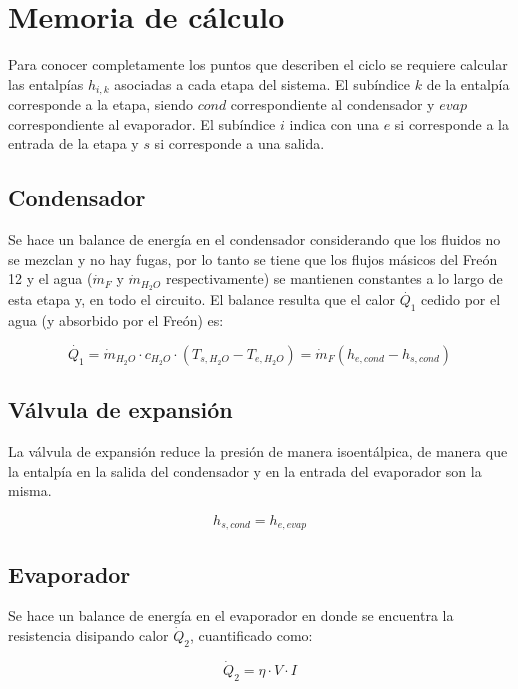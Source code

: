 \documentclass[11pt,letterpaper]{extarticle}        %
\numberwithin{equation}{section}                    %
\begin{document}
\section{Memoria de cálculo}
Para conocer completamente los puntos que describen el ciclo se requiere calcular las entalpías $h_{i,k}$ asociadas a cada etapa del sistema. El subíndice $k$ de la entalpía corresponde a la etapa, siendo $cond$ correspondiente al condensador y $evap$ correspondiente al evaporador. El subíndice $i$ indica con una $e$ si corresponde a la entrada de la etapa y $s$  si corresponde a una salida.

\subsection{Condensador}
Se hace un balance de energía en el condensador considerando que los fluidos no se mezclan y no hay fugas, por lo tanto se tiene que los flujos másicos del Freón 12 y el agua ($\dot{m}_F$ y $\dot{m}_{H_2O}$ respectivamente) se mantienen constantes a lo largo de esta etapa y, en todo el circuito. El balance resulta que el calor $\dot{Q_1}$ cedido por el agua (y absorbido por el Freón) es:

\begin{equation}
\label{e:Q1}
\dot{Q_1} = \dot{m}_{H_2O} \cdot c_{H_2O} \cdot (T_{s,H_2O}-T_{e,H_2O}) = \dot{m}_F (h_{e,cond} - h_{s,cond})
\end{equation}

\subsection{Válvula de expansión}
La válvula de expansión reduce la presión de manera isoentálpica, de manera que la entalpía en la salida del condensador y en la entrada del evaporador son la misma.

\begin{equation}
\label{e:Valvula}
h_{s,cond} = h_{e,evap}
\end{equation}

\subsection{Evaporador}
Se hace un balance de energía en el evaporador en donde se encuentra la resistencia disipando calor $\dot{Q}_2$, cuantificado como:

\begin{equation}
\label{e:Q2}
\dot{Q}_2 = \eta \cdot V \cdot I
\end{equation}
\end{document}

